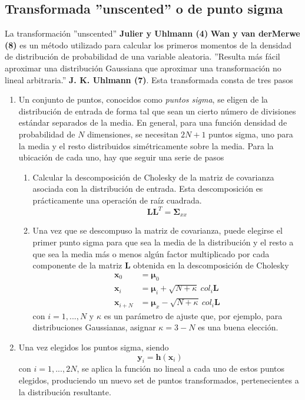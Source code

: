 \subsection{Transformada ''unscented'' o de punto sigma}
La transformación ''unscented''  \textbf{Julier y Uhlmann (4)} \textbf{Wan y van derMerwe (8)} es un método utilizado para calcular los primeros momentos de la densidad de distribución de probabilidad de una variable aleatoria. ''Resulta más fácil aproximar una distribución Gaussiana que aproximar una transformación no lineal arbitraria.'' \textbf{J. K. Uhlmann (7)}. Esta transformada consta de tres pasos
\begin{enumerate}
    \item Un conjunto de puntos, conocidos como \textit{puntos sigma}, se eligen de la distribución de entrada de forma tal que sean un cierto número de divisiones estándar separados de la media. En general, para una función densidad de probabilidad de $N$ dimensiones, se necesitan $2N + 1$ puntos sigma, uno para la media y el resto distribuidos simétricamente sobre la media. Para la ubicación de cada uno, hay que seguir una serie de pasos
    \begin{enumerate}
        \item Calcular la descomposición de Cholesky de la matriz de covarianza asociada con la distribución de entrada. Esta descomposición es prácticamente una operación de raíz cuadrada.
        \begin{equation}
            \bm{L}\bm{L}^T = \bm{\Sigma}_{xx}
        \end{equation}
        \item Una vez que se descompuso la matriz de covarianza, puede elegirse el primer punto sigma para que sea la media de la distribución y el resto a que sea la media más o menos algún factor multiplicado por cada componente de la matriz $\bm{L}$ obtenida en la descomposición de Cholesky
        \begin{align}
            \bm{x}_0 &= \bm{\mu}_0 \\
            \bm{x}_i &= \bm{\mu}_i + \sqrt{N+\kappa}\ col_i\bm{L} \\
            \bm{x}_{i+N} &= \bm{\mu}_x - \sqrt{N+\kappa}\ col_i\bm{L}
        \end{align}
        con $i = 1, ..., N$ y $\kappa$ es un parámetro de ajuste que, por ejemplo, para distribuciones Gaussianas, asignar $\kappa = 3 - N$ es una buena elección.
    \end{enumerate}
    \item Una vez elegidos los puntos sigma, siendo
    \begin{equation}
        \bm{y}_i = \bm{h}(\bm{x}_i)
    \end{equation}
    con $i = 1, ..., 2N$, se aplica la función no lineal a cada uno de estos puntos elegidos, produciendo un nuevo set de puntos transformados, pertenecientes a la distribución resultante.
    

\end{enumerate}
